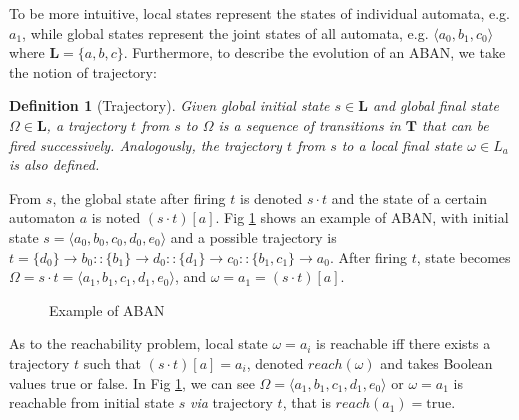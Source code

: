 \documentclass[en]{jdoc}
\newtheorem{definition}{Definition}
\newcommand{\acm}[3]{#1\rightarrow#2}
\begin{document}
To be more intuitive, local states represent the states of individual automata, e.g. $a_1$, while global states represent the joint states of all automata, e.g. $\langle a_0, b_1,c_0 \rangle$ where $\mathbf{L}=\{a,b,c\}$. 
Furthermore, to describe the evolution of an ABAN, we take the notion of trajectory:
\begin{definition}[Trajectory]
Given global initial state $s\in \mathbf{L}$ and global final state $\Omega\in \mathbf{L}$, a trajectory $t$ from $s$ to $\Omega$ is a sequence of transitions in $\mathbf{T}$ that can be fired successively. 
Analogously, the trajectory $t$ from $s$ to a local final state $\omega\in L_a$ is also defined.%
\end{definition}

From $s$, the global state after firing $t$ is denoted $s\cdot t$ and the state of a certain automaton $a$ is noted $(s\cdot t)[a]$.
Fig \ref{exampleABAN} shows an example of ABAN, with initial state $s=\langle a_0,b_0,c_0,d_0,e_0\rangle$ and a possible trajectory is $t=\acm{\{d_0\}}{b_0}{b_1}::\acm{\{b_1\}}{d_0}{d_1}::\acm{\{d_1\}}{c_0}{c_1}::\acm{\{b_1,c_1\}}{a_0}{a_1}$. 
After firing $t$, state becomes $\Omega=s\cdot t=\langle a_1,b_1,c_1,d_1,e_0\rangle$, and $\omega= a_1= (s\cdot t)[a]$.

\begin{figure}[ht]
\centering

\caption{Example of ABAN}\label{exampleABAN}
\end{figure}
As to the reachability problem, local state $\omega=a_i$ is reachable iff there exists a trajectory $t$ such that $(s\cdot t)[a]=a_i$, denoted $reach (\omega)$ and takes Boolean values true or false. 
In Fig \ref{exampleABAN}, we can see $\Omega=\langle a_1,b_1,c_1,d_1,e_0\rangle$ or $\omega=a_1$ is reachable from initial state $s$ \textit{via} trajectory $t$, that is $reach(a_1)=\text{true}$.
\end{document}
